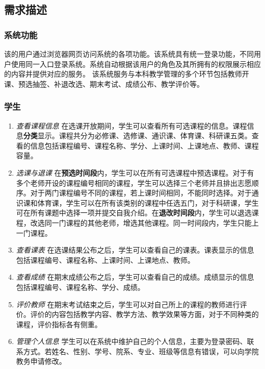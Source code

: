 \subsection{需求描述}

\subsubsection{系统功能}
\ttfamily
该的用户通过浏览器{\sffamily 网页}访问系统的各项功能。该系统具有{\sffamily 统一登录}功能，不同用户使用同一入口登录系统。系统自动根据该用户的角色及其所拥有的权限展示相应的内容并提供对应的服务。
该系统服务与本科教学管理的多个环节包括教师开课、预选抽签、补退改选、期末考试、成绩公布、教学评价等。

\normalfont

\subsubsection{学生}
\begin{enumerate}
    \item \textit{查看课程信息} \quad 在选课开放期间，学生可以查看所有可选课程的信息。课程信息\textbf{分类}显示。课程共分为必修课、选修课、通识课、体育课、科研课五类。查看的信息包括课程编号、课程名称、学分、上课时间、上课地点、教师、课程容量。
    \item \textit{选课与退课} \quad 在\textbf{预选时间段}内，学生可以在所有可选课程中预选课程。对于有多个老师开设的课程编号相同的课程，学生可以选择三个老师并且排出志愿顺序。对于两门课程编号不同的课程，若上课时间相同，不能同时选择。对于通识课和体育课，学生可以在所有该类别的课程中任选五门，对于科研课，学生可在所有课题中选择一项并提交自我介绍。在\textbf{退改时间段}内，学生可以退选课程，改选同一门课程的其他老师，增选其他课程。同一时间段内，学生只能上一门课程。
    \item \textit{查看课表} \quad 在选课结果公布之后，学生可以查看自己的课表。课表显示的信息包括课程编号、课程名称、上课时间、上课地点、教师。
    \item \textit{查看成绩} \quad 在期末成绩公布之后，学生可以查看自己的成绩。成绩显示的信息包括课程编号、课程名称、学分、成绩。
    \item \textit{评价教师} \quad 在期末考试结束之后，学生可以对自己所上的课程的教师进行评价。评价的内容包括教学内容、教学方法、教学效果等方面，对于不同种类的课程，评价指标各有侧重。
    \item \textit{管理个人信息} \quad 学生可以在系统中维护自己的个人信息，主要为登录密码、联系方式。若姓名、性别、学号、院系、专业、班级等信息有错误，可以向学院教务申请修改。
\end{enumerate}

